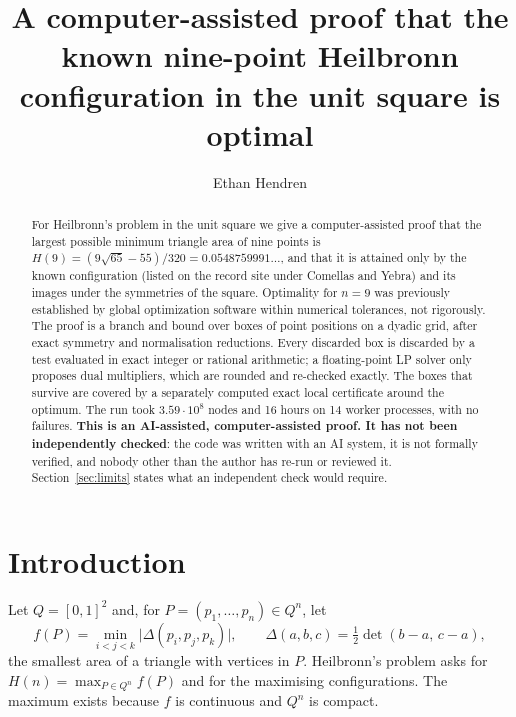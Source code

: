 \documentclass[11pt]{amsart}
\theoremstyle{definition}
\newcommand{\sq}{[0,1]^2}
\begin{document}
\title[The 9-point Heilbronn configuration is optimal]{A computer-assisted proof that the known nine-point Heilbronn configuration in the unit square is optimal}

\author{Ethan Hendren}

\begin{abstract}
For Heilbronn's problem in the unit square we give a computer-assisted proof that the largest possible minimum triangle area of nine points is $H(9) = (9\sqrt{65}-55)/320 = 0.0548759991\ldots$, and that it is attained only by the known configuration (listed on the record site under Comellas and Yebra) and its images under the symmetries of the square.
Optimality for $n = 9$ was previously established by global optimization software within numerical tolerances, not rigorously.
The proof is a branch and bound over boxes of point positions on a dyadic grid, after exact symmetry and normalisation reductions. Every discarded box is discarded by a test evaluated in exact integer or rational arithmetic; a floating-point LP solver only proposes dual multipliers, which are rounded and re-checked exactly. The boxes that survive are covered by a separately computed exact local certificate around the optimum. The run took $3.59\cdot10^{8}$ nodes and 16 hours on 14 worker processes, with no failures.
\textbf{This is an AI-assisted, computer-assisted proof. It has not been independently checked}: the code was written with an AI system, it is not formally verified, and nobody other than the author has re-run or reviewed it. Section~\ref{sec:limits} states what an independent check would require.
\end{abstract}

\maketitle

\section{Introduction}\label{sec:intro}

Let $Q = \sq$ and, for $P = (p_1,\dots,p_n) \in Q^n$, let
\[
  f(P) = \min_{i<j<k} \lvert\Delta(p_i,p_j,p_k)\rvert, \qquad \Delta(a,b,c) = \tfrac12 \det(b-a,\, c-a),
\]
the smallest area of a triangle with vertices in $P$. Heilbronn's problem asks for $H(n) = \max_{P \in Q^n} f(P)$ and for the maximising configurations. The maximum exists because $f$ is continuous and $Q^n$ is compact.
\end{document}
